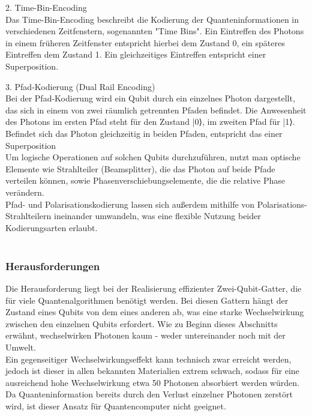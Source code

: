 2. Time-Bin-Encoding \\
Das Time-Bin-Encoding beschreibt die Kodierung der Quanteninformationen in verschiedenen Zeitfenstern, sogenannten "Time Bins". 
Ein Eintreffen des Photons in einem früheren Zeitfenster entspricht hierbei dem Zustand 0, ein späteres Eintreffen dem Zustand 1. Ein gleichzeitiges Eintreffen entspricht einer Superposition. \\ \cite{obrien_optical_2007}

3. Pfad-Kodierung (Dual Rail Encoding)\\
Bei der Pfad-Kodierung wird ein Qubit durch ein einzelnes Photon dargestellt, das sich in einem von zwei räumlich getrennten Pfaden befindet. Die Anwesenheit des Photons im ersten Pfad steht für den Zustand |0⟩, im zweiten Pfad für |1⟩. Befindet sich das Photon gleichzeitig in beiden Pfaden, entspricht das einer Superposition\\

Um logische Operationen auf solchen Qubits durchzuführen, nutzt man optische Elemente wie Strahlteiler (Beamsplitter), die das Photon auf beide Pfade verteilen können, sowie Phasenverschiebungselemente, die die relative Phase verändern. \\

Pfad- und Polarisationskodierung lassen sich außerdem mithilfe von Polarisations-Strahlteilern ineinander umwandeln, was eine flexible Nutzung beider Kodierungsarten erlaubt.  \cite{nielsen_quantum_2010}\\\\

\subsubsection{Herausforderungen}
Die Herausforderung liegt bei der Realisierung effizienter Zwei-Qubit-Gatter, die für viele Quantenalgorithmen benötigt werden. Bei diesen Gattern hängt der Zustand eines Qubits von dem eines anderen ab, was eine starke Wechselwirkung zwischen den einzelnen Qubits erfordert. Wie zu Beginn dieses Abschnitts erwähnt, wechselwirken Photonen kaum - weder untereinander noch mit der Umwelt. \\
Ein gegenseitiger Wechselwirkungseffekt kann technisch zwar erreicht werden, jedoch ist dieser in allen bekannten Materialien extrem schwach, sodass für eine ausreichend hohe Wechselwirkung etwa 50 Photonen absorbiert werden würden. Da Quanteninformation bereits durch den Verlust einzelner Photonen zerstört wird, ist dieser Ansatz für Quantencomputer nicht geeignet. \\

